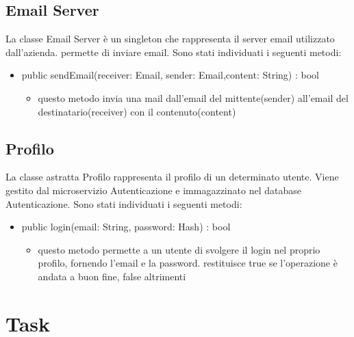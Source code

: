 \documentclass{report}
\begin{document}
\subsection*{Email Server}
La classe Email Server è un singleton che rappresenta il server email utilizzato dall'azienda. permette di inviare email.
Sono stati individuati i seguenti metodi:
\begin{itemize}
	\item public sendEmail(receiver: Email, sender: Email,content: String) : bool
	\begin{itemize}
		\item questo metodo invia una mail dall'email del mittente(sender) all'email del destinatario(receiver) con il contenuto(content)
	\end{itemize}
\end{itemize}
\subsection*{Profilo}
La classe astratta Profilo rappresenta il profilo di un determinato utente. Viene gestito dal microservizio Autenticazione e immagazzinato nel database Autenticazione.
Sono stati individuati i seguenti metodi:
\begin{itemize}
	\item public login(email: String, password: Hash) : bool
	\begin{itemize}
		\item questo metodo permette a un utente di svolgere il login nel proprio profilo, fornendo l'email e la password. restituisce true se l'operazione è andata a buon fine, false altrimenti
	\end{itemize}
\end{itemize}











\section{Task}
\end{document}
